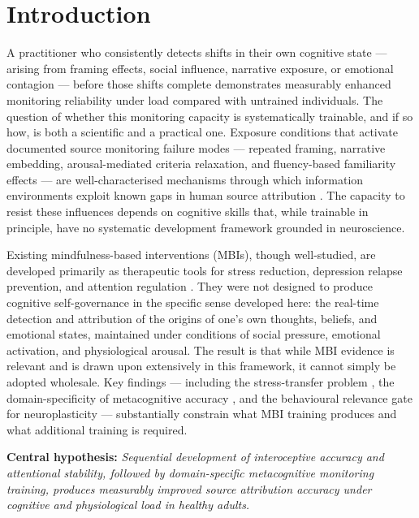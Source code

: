 \documentclass[12pt, a4paper]{article}
\begin{document}
\newpage
\tableofcontents
\newpage

\section{Introduction}

A practitioner who consistently detects shifts in their own cognitive state --- arising
from framing effects, social influence, narrative exposure, or emotional contagion ---
before those shifts complete demonstrates measurably enhanced monitoring reliability
under load compared with untrained individuals. The question of whether this monitoring
capacity is systematically trainable, and if so how, is both a scientific and a
practical one. Exposure conditions that activate documented source monitoring failure
modes --- repeated framing, narrative embedding, arousal-mediated criteria relaxation,
and fluency-based familiarity effects --- are well-characterised mechanisms through
which information environments exploit known gaps in human source attribution
\citep{johnson1993}. The capacity to resist these influences depends on
cognitive skills that, while trainable in principle, have no systematic development
framework grounded in neuroscience.

Existing mindfulness-based interventions (MBIs), though well-studied, are developed
primarily as therapeutic tools for stress reduction, depression relapse prevention,
and attention regulation \citep{gkintoni2025, calderone2024}. They were not designed
to produce cognitive self-governance in the specific sense developed here: the
real-time detection and attribution of the origins of one's own thoughts, beliefs,
and emotional states, maintained under conditions of social pressure, emotional
activation, and physiological arousal. The result is that while MBI evidence is
relevant and is drawn upon extensively in this framework, it cannot simply be adopted
wholesale. Key findings --- including the stress-transfer problem \citep{raio2013},
the domain-specificity of metacognitive accuracy \citep{morales2018, fleming2014},
and the behavioural relevance gate for neuroplasticity \citep{fallon2009,
beyeler2017} --- substantially constrain what MBI training produces and what
additional training is required.

\medskip\noindent
\textbf{Central hypothesis:} \textit{Sequential development of interoceptive
accuracy and attentional stability, followed by domain-specific metacognitive
monitoring training, produces measurably improved source attribution accuracy
under cognitive and physiological load in healthy adults.}
\medskip
\end{document}
